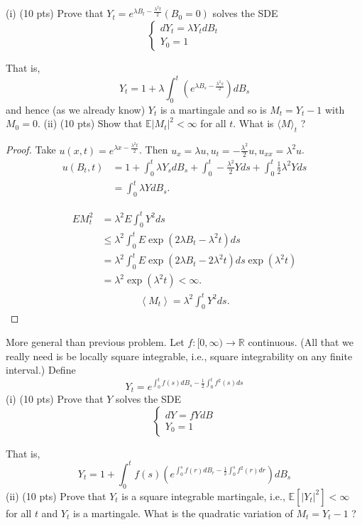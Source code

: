 \begin{problem}
	(i) (10 pts) Prove that $Y_t=e^{\lambda B_t-\frac{\lambda^2 t}{2}}\left(B_0=0\right)$ solves the SDE
\[
\left\{\begin{array}{l}
d Y_t=\lambda Y_t d B_t \\
Y_0=1
\end{array}\right.
\]

That is,
\[
Y_t=1+\lambda \int_0^t\left(e^{\lambda B_s-\frac{\lambda^2 s}{2}}\right) d B_s
\]
and hence (as we already know) $Y_t$ is a martingale and so is $M_t=Y_t-1$ with $M_0=0$.
(ii) (10 pts) Show that $\mathbb{E}\left|M_t\right|^2<\infty$ for all $t$. What is $\langle M\rangle_t$ ?
	
\end{problem}
\begin{proof}
	Take $u(x, t) = e^{\lambda x - \frac{\lambda^2 t}{2}}$. Then $u_x = \lambda u, u_t = - \frac{\lambda^2}{2} u, u_{xx} =  \lambda^2 u$.
	\begin{align*}
		u(B_t, t) &= 1 + \int _0^t \lambda Y_s d B_s + \int _0^t -\frac{\lambda^2}{2} Y ds + \int _0^t \frac{1}{2} \lambda^2 Y ds \\
		&= \int _0^t \lambda Y d B_s
	.\end{align*}
	
	 \begin{align*}
		 E M_t^2  &= \lambda^2 E \int _0^t Y^2 ds\\
			  &\leq \lambda^2 \int _0^t E \exp\left( 2 \lambda B_t - \lambda^2 t \right) ds \\
			  &= \lambda^2 \int _0^t E \exp\left( 2 \lambda B_t - 2\lambda^2 t \right) ds \exp(\lambda^2 t)  \\
			  &= \lambda^2 \exp(\lambda^2 t)  < \infty 
	.\end{align*}
	\begin{align*}
		\left\langle M_t \right\rangle  = \lambda^2 \int _0^t Y^2 ds
	.\end{align*}
\end{proof}
\begin{problem}
	More general than previous problem. Let $f:[0, \infty) \rightarrow \mathbb{R}$ continuous. (All that we really need is be locally square integrable, i.e., square integrability on any finite interval.) Define
\[
Y_t=e^{\int_0^t f(s) d B_s-\frac{1}{2} \int_0^t f^2(s) d s}
\]
(i) (10 pts) Prove that $Y$ solves the SDE
\[
\left\{\begin{array}{l}
d Y=f Y d B \\
Y_0=1
\end{array}\right.
\]

That is,
\[
Y_t=1+\int_0^t f(s)\left(e^{\int_0^s f(r) d B_r-\frac{1}{2} \int_0^s f^2(r) d r}\right) d B_s
\]
(ii) (10 pts) Prove that $Y_t$ is a square integrable martingale, i.e., $\mathbb{E}\left[\left|Y_t\right|^2\right]<\infty$ for all $t$ and $Y_t$ is a martingale. What is the quadratic variation of $M_t=Y_t-1$ ?
\end{problem}
